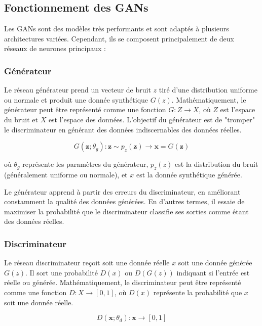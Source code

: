\subsection{Fonctionnement des GANs}

Les GANs sont des modèles très performants et sont adaptés à plusieurs
architectures variées. Cependant, ils se composent principalement de deux
réseaux de neurones principaux :

\subsubsection{Générateur}

Le réseau générateur prend un vecteur de bruit \( z \) tiré d’une distribution
uniforme ou normale et produit une donnée synthétique \( G(z) \).
Mathématiquement, le générateur peut être représenté comme une fonction \( G :
Z \rightarrow X \), où \( Z \) est l'espace du bruit et \( X \) est l'espace
des données. L’objectif du générateur est de "tromper" le discriminateur en
générant des données indiscernables des données réelles.

\begin{equation}
    G(\mathbf{z}; \theta_g) : \mathbf{z} \sim p_z(\mathbf{z}) \rightarrow \mathbf{x} = G(\mathbf{z})
\end{equation}


où \( \theta_g \) représente les paramètres du générateur, \( p_z(z) \) est la
distribution du bruit (généralement uniforme ou normale), et \( x \) est la
donnée synthétique générée.

Le générateur apprend à partir des erreurs du discriminateur, en améliorant
constamment la qualité des données générées. En d'autres termes, il essaie de
maximiser la probabilité que le discriminateur classifie ses sorties comme
étant des données réelles.

\subsubsection{Discriminateur}

Le réseau discriminateur reçoit soit une donnée réelle \( x \) soit une donnée
générée \( G(z) \). Il sort une probabilité \( D(x) \) ou \( D(G(z)) \)
indiquant si l’entrée est réelle ou générée. Mathématiquement, le
discriminateur peut être représenté comme une fonction \( D : X \rightarrow [0,
	1] \), où \( D(x) \) représente la probabilité que \( x \) soit une donnée
réelle.

\begin{equation}
    D(\mathbf{x}; \theta_d) : \mathbf{x} \rightarrow [0, 1]
\end{equation}



